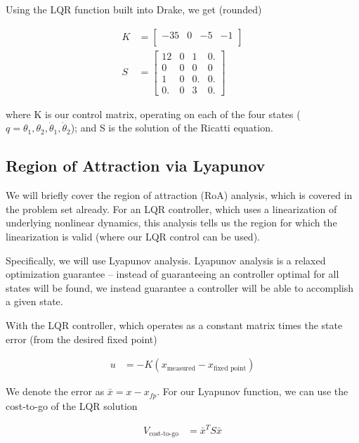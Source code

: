 \documentclass[conference]{IEEEtran}
\begin{document}
Using the LQR function built into Drake, we get (rounded)

\begin{align}
    K &=
    \begin{bmatrix}
        -35 & 0 & -5 & -1 \\
    \end{bmatrix}\\
    S &=
    \begin{bmatrix}
        12 & 0 & 1  & 0. \\
        0 & 0 & 0 & 0 \\
        1 & 0 & 0. & 0. \\
        0. & 0 & 3 & 0.
    \end{bmatrix}
\end{align}

where K is our control matrix, operating on each of the four states ($q =
\theta_1, \theta_2, \dot \theta_1, \dot \theta_2$); and S is the solution of the
Ricatti equation.


\subsection{Region of Attraction via Lyapunov}

We will briefly cover the region of attraction (RoA) analysis, which is covered
in the problem set already. For an LQR controller, which uses a linearization of
underlying nonlinear dynamics, this analysis tells us the region for which the
linearization is valid (where our LQR control can be used). 

Specifically, we will use Lyapunov analysis. Lyapunov analysis is a relaxed
optimization guarantee -- instead of guaranteeing an controller optimal for all
states will be found, we instead guarantee a controller will be able to
accomplish a given state. 

With the LQR controller, which operates as a constant matrix times the 
state error (from the desired fixed point)

\begin{align}
    u &= - K(x_{\text{measured}} - x_{\text{fixed point}})
\end{align}

We denote the error as $\bar x = x - x_{fp}$. For our Lyapunov function, we can use the cost-to-go of the LQR solution 

\begin{align}
    V_{\text{cost-to-go}} &= \bar x^T S \bar x
\end{align}
\end{document}

